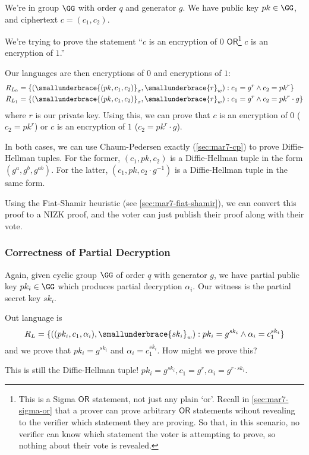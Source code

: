 We're in group $\GG$ with order $q$ and generator $g$. We have public key $pk\in \GG$, and ciphertext $c = (c_1, c_2)$.

We're trying to prove the statement ``$c$ is an encryption of $0$ $\mathsf{OR}$\footnote{This is a Sigma $\mathsf{OR}$ statement, not just any plain `or'. Recall in \cref{sec:mar7-sigma-or} that a prover can prove arbitrary $\mathsf{OR}$ statements wihout revealing to the verifier which statement they are proving. So that, in this scenario, no verifier can know which statement the voter is attempting to prove, so nothing about their vote is revealed.} $c$ is an encryption of $1$.''

Our languages are then encryptions of $0$ and encryptions of $1$:
\begin{align*}
    R_{L_0} & = \{(\smallunderbrace{(pk, c_1, c_2)}_{x}, \smallunderbrace{r}_{w}) : c_1 = g^r\land c_2 = pk^r\}        \\
    R_{L_1} & = \{(\smallunderbrace{(pk, c_1, c_2)}_{x}, \smallunderbrace{r}_{w}) : c_1 = g^r\land c_2 = pk^r\cdot g\}
\end{align*}
where $r$ is our private key. Using this, we can prove that $c$ is an encryption of $0$ ($c_2 = pk^r$) or $c$ is an encryption of $1$ ($c_2 = pk^r\cdot g$).

In both cases, we can use Chaum-Pedersen exactly (\cref{sec:mar7-cp}) to prove Diffie-Hellman tuples. For the former, $(c_1, pk, c_2)$ is a Diffie-Hellman tuple in the form $(g^a, g^b, g^{ab})$. For the latter, $(c_1, pk, c_2\cdot g^{-1})$ is a Diffie-Hellman tuple in the same form.

Using the Fiat-Shamir heuristic (see \cref{sec:mar7-fiat-shamir}), we can convert this proof to a NIZK proof, and the voter can just publish their proof along with their vote.

\subsubsection{Correctness of Partial Decryption}
Again, given cyclic group $\GG$ of order $q$ with generator $g$, we have partial public key $pk_i\in \GG$ which produces partial decryption $\alpha_i$. Our witness is the partial secret key $sk_i$.

Out language is
\[R_L = \{((pk_i, c_1, \alpha_i), \smallunderbrace{sk_i}_{w}): pk_i = g^{sk_i}\land \alpha_i = c_1^{sk_i}\}\]
and we prove that $pk_i = g^{sk_i}$ and $\alpha_i = c_1^{sk_i}$. How might we prove this?

This is still the Diffie-Hellman tuple! $pk_i = g^{sk_i}, c_1 = g^r, \alpha_i = g^{r\cdot sk_i}$.

